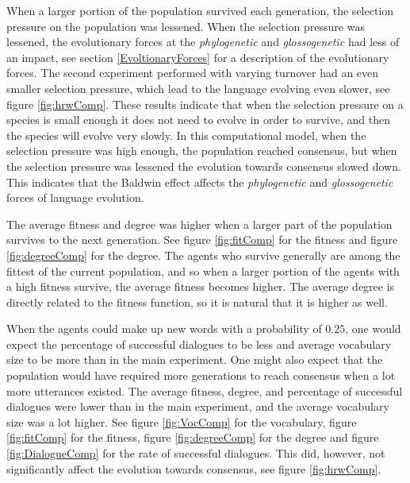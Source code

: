 When a larger portion of the population survived each generation, the selection pressure on the population was lessened. When the selection pressure was lessened, the evolutionary forces at the \textit{phylogenetic} and \textit{glossogenetic} had less of an impact, see section \ref{EvoltionaryForces} for a description of the evolutionary forces. The second experiment performed with varying turnover had an even smaller selection pressure, which lead to the language evolving even slower, see figure \ref{fig:hrwComp}. These results indicate that when the selection pressure on a species is small enough it does not need to evolve in order to survive, and then the species will evolve very slowly. In this computational model, when the selection pressure was high enough, the population reached consensus, but when the selection pressure was lessened the evolution towards consensus slowed down. This indicates that the Baldwin effect affects the \textit{phylogenetic} and \textit{glossogenetic} forces of language evolution. 

The average fitness and degree was higher when a larger part of the population survives to the next generation. See figure \ref{fig:fitComp} for the fitness and figure \ref{fig:degreeComp} for the degree. The agents who survive generally are among the fittest of the current population, and so when a larger portion of the agents with a high fitness survive, the average fitness becomes higher. The average degree is directly related to the fitness function, so it is natural that it is higher as well. 

When the agents could make up new words with a probability of $0.25$, one would expect the percentage of successful dialogues to be less and average vocabulary size to be more than in the main experiment. One might also expect that the population would have required more generations to reach consensus when a lot more utterances existed. The average fitness, degree, and percentage of successful dialogues were lower than in the main experiment, and the average vocabulary size was a lot higher. See figure \ref{fig:VocComp} for the vocabulary, figure \ref{fig:fitComp} for the fitness, figure \ref{fig:degreeComp} for the degree and figure \ref{fig:DialogueComp} for the rate of successful dialogues. This did, however, not significantly affect the evolution towards consensus, see figure \ref{fig:hrwComp}. 

